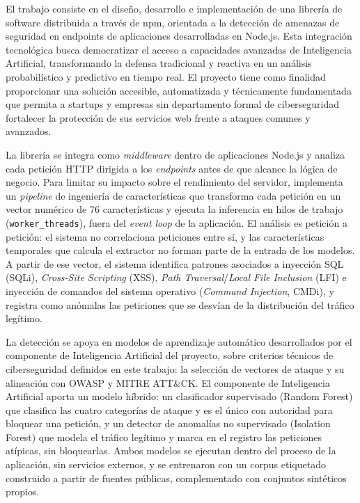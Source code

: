 El trabajo consiste en el diseño, desarrollo e implementación de una librería de software
distribuida a través de npm, orientada a la detección de amenazas de seguridad en
endpoints de aplicaciones desarrolladas en Node.js. Esta integración tecnológica busca
democratizar el acceso a capacidades avanzadas de Inteligencia Artificial, transformando la
defensa tradicional y reactiva en un análisis probabilístico y predictivo en tiempo real. El
proyecto tiene como finalidad proporcionar una solución accesible, automatizada y
técnicamente fundamentada que permita a startups y empresas sin departamento formal de
ciberseguridad fortalecer la protección de sus servicios web frente a ataques comunes y
avanzados.

La librería se integra como \textit{middleware} dentro de aplicaciones Node.js y analiza cada
petición HTTP dirigida a los \textit{endpoints} antes de que alcance la lógica de negocio. Para limitar su impacto sobre el rendimiento del servidor, implementa un \textit{pipeline} de ingeniería de
características que transforma cada petición en un vector numérico de 76 características y ejecuta
la inferencia en hilos de trabajo (\texttt{worker\_threads}), fuera del \textit{event loop} de la
aplicación. El análisis es petición a petición: el sistema no correlaciona peticiones entre sí, y
las características temporales que calcula el extractor no forman parte de la entrada de los
modelos. A partir de ese vector, el sistema identifica patrones asociados a inyección SQL (SQLi),
\textit{Cross-Site Scripting} (XSS), \textit{Path Traversal}/\textit{Local File Inclusion} (LFI) e
inyección de comandos del sistema operativo (\textit{Command Injection}, CMDi), y registra como anómalas
las peticiones que se desvían de la distribución del tráfico legítimo.

La detección se apoya en modelos de aprendizaje automático desarrollados por el componente de
Inteligencia Artificial del proyecto, sobre criterios técnicos de ciberseguridad definidos en este
trabajo: la selección de vectores de ataque y su alineación con OWASP y MITRE ATT\&CK. El componente
de Inteligencia Artificial aporta un modelo híbrido: un clasificador supervisado (Random Forest) que
clasifica las cuatro categorías de ataque y es el único con autoridad para bloquear una petición, y
un detector de anomalías no supervisado (Isolation Forest) que modela el tráfico legítimo y marca en
el registro las peticiones atípicas, sin bloquearlas. Ambos modelos se ejecutan dentro del proceso
de la aplicación, sin servicios externos, y se entrenaron con un corpus etiquetado construido a
partir de fuentes públicas, complementado con conjuntos sintéticos propios.


